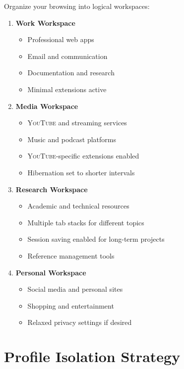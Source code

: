 \documentclass[11pt,a4paper,oneside]{book}
\newcommand{\youtube}{\textsc{YouTube}}
\begin{document}
Organize your browsing into logical workspaces:

\begin{enumerate}
    \item \textbf{Work Workspace}
    \begin{itemize}
        \item Professional web apps
        \item Email and communication
        \item Documentation and research
        \item Minimal extensions active
    \end{itemize}
    
    \item \textbf{Media Workspace}
    \begin{itemize}
        \item \youtube{} and streaming services
        \item Music and podcast platforms
        \item \youtube{}-specific extensions enabled
        \item Hibernation set to shorter intervals
    \end{itemize}
    
    \item \textbf{Research Workspace}
    \begin{itemize}
        \item Academic and technical resources
        \item Multiple tab stacks for different topics
        \item Session saving enabled for long-term projects
        \item Reference management tools
    \end{itemize}
    
    \item \textbf{Personal Workspace}
    \begin{itemize}
        \item Social media and personal sites
        \item Shopping and entertainment
        \item Relaxed privacy settings if desired
    \end{itemize}
\end{enumerate}

\section{Profile Isolation Strategy}
\end{document}
